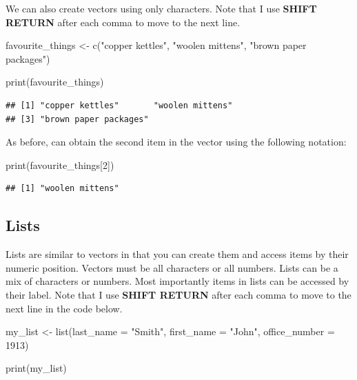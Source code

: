 \documentclass[
]{krantz}
\makeatletter
\newenvironment{Shaded}{\begin{snugshade}}{\end{snugshade}}
\newcommand{\AttributeTok}[1]{\textcolor[rgb]{0.61,0.61,0.61}{#1}}
\newcommand{\DecValTok}[1]{\textcolor[rgb]{0.06,0.06,0.06}{#1}}
\newcommand{\FunctionTok}[1]{\textcolor[rgb]{0,0,0}{#1}}
\newcommand{\NormalTok}[1]{#1}
\newcommand{\OtherTok}[1]{\textcolor[rgb]{0.37,0.37,0.37}{#1}}
\newcommand{\StringTok}[1]{\textcolor[rgb]{0.5,0.5,0.5}{#1}}
\newenvironment{kframe}{%
\medskip{}
\setlength{\fboxsep}{.8em}
 \def\at@end@of@kframe{}%
 \ifinner\ifhmode%
  \def\at@end@of@kframe{\end{minipage}}%
  \begin{minipage}{\columnwidth}%
 \fi\fi%
 \def\FrameCommand##1{\hskip\@totalleftmargin \hskip-\fboxsep
 \colorbox{shadecolor}{##1}\hskip-\fboxsep
     \hskip-\linewidth \hskip-\@totalleftmargin \hskip\columnwidth}%
 \MakeFramed {\advance\hsize-\width
   \@totalleftmargin\z@ \linewidth\hsize
   \@setminipage}}%
 {\par\unskip\endMakeFramed%
 \at@end@of@kframe}
\renewenvironment{Shaded}{\begin{kframe}}{\end{kframe}}
\makeatother
\begin{document}
We can also create vectors using only characters. Note that I use \textbf{SHIFT RETURN} after each comma to move to the next line.

\begin{Shaded}
\begin{Highlighting}[]
\NormalTok{favourite\_things }\OtherTok{\textless{}{-}} \FunctionTok{c}\NormalTok{(}\StringTok{"copper kettles"}\NormalTok{,}
                      \StringTok{"woolen mittens"}\NormalTok{,}
                      \StringTok{"brown paper packages"}\NormalTok{)}
\end{Highlighting}
\end{Shaded}

\begin{Shaded}
\begin{Highlighting}[]
\FunctionTok{print}\NormalTok{(favourite\_things)}
\end{Highlighting}
\end{Shaded}

\begin{verbatim}
## [1] "copper kettles"       "woolen mittens"      
## [3] "brown paper packages"
\end{verbatim}

As before, can obtain the second item in the vector using the following notation:

\begin{Shaded}
\begin{Highlighting}[]
\FunctionTok{print}\NormalTok{(favourite\_things[}\DecValTok{2}\NormalTok{])}
\end{Highlighting}
\end{Shaded}

\begin{verbatim}
## [1] "woolen mittens"
\end{verbatim}

\hypertarget{lists}{%
\subsection{Lists}\label{lists}}

Lists are similar to vectors in that you can create them and access items by their numeric position. Vectors must be all characters or all numbers. Lists can be a mix of characters or numbers. Most importantly items in lists can be accessed by their label. Note that I use \textbf{SHIFT RETURN} after each comma to move to the next line in the code below.

\begin{Shaded}
\begin{Highlighting}[]
\NormalTok{my\_list }\OtherTok{\textless{}{-}} \FunctionTok{list}\NormalTok{(}\AttributeTok{last\_name =} \StringTok{"Smith"}\NormalTok{,}
                \AttributeTok{first\_name =} \StringTok{"John"}\NormalTok{,}
                \AttributeTok{office\_number =} \DecValTok{1913}\NormalTok{)}

\FunctionTok{print}\NormalTok{(my\_list)}
\end{Highlighting}
\end{Shaded}
\end{document}
